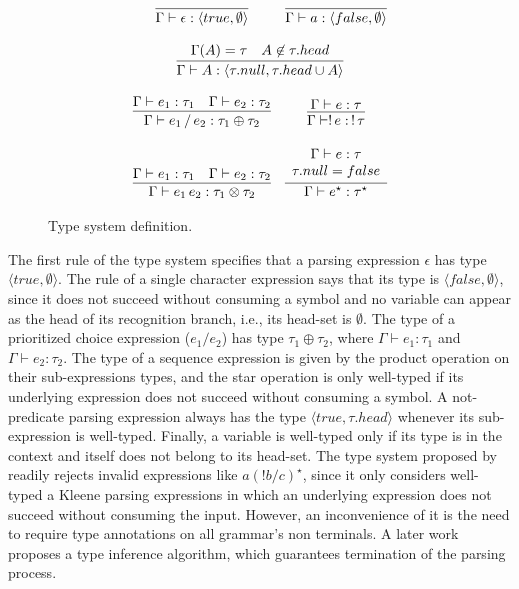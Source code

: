 \documentclass[preprint,12pt]{elsarticle}
\theoremstyle{definition}
\begin{document}
\begin{figure}[h!]
\[
  \begin{array}{cc}
    \infer{\Gamma \vdash \epsilon : \langle true , \emptyset \rangle}{} &
    \infer{\Gamma \vdash a : \langle false , \emptyset\rangle}{} \\ \\
    \multicolumn{2}{c}{
      \infer{\Gamma \vdash A : \langle \tau.null, \tau.head \cup {A}\rangle}
            {\Gamma(A) = \tau & A \not\in \tau.head}
    }\\ \\
    \infer{\Gamma\vdash e_1\,/\,e_2 : \tau_1 \oplus \tau_2}
          {\Gamma \vdash e_1 : \tau_1 & \Gamma \vdash e_2 : \tau_2}
    &
    \infer{\Gamma\vdash !\,e :\, !\,\tau}
          {\Gamma \vdash e : \tau}\\ \\
    \infer{\Gamma\vdash e_1\,e_2 : \tau_1 \otimes \tau_2}
          {\Gamma \vdash e_1 : \tau_1 & \Gamma \vdash e_2 : \tau_2} &
    \infer{\Gamma\vdash e^\star : \tau^\star}
          {\begin{array}{c}
             \Gamma \vdash e : \tau\\
             \tau.null = false\\
           \end{array}}
  \end{array}
\]
\centering
\caption{Type system definition.}
\label{fig:typesystem}
\end{figure}

The first rule of the type system specifies that a parsing
expression $\epsilon$ has type $\langle true, \emptyset \rangle$.
The rule of a single character expression says that its type is
$\langle false, \emptyset\rangle$, since it does not succeed without
consuming a symbol and no variable can appear as the head of its
recognition branch, i.e., its head-set is $\emptyset$. The type of a prioritized
choice expression ($e_1/e_2$) has type $\tau_1 \oplus \tau_2$,
where $\Gamma \vdash e_1 : \tau_1$ and $\Gamma \vdash e_2 : \tau_2$.
The type of a sequence expression is given by the product operation
on their sub-expressions types, and the star operation is only well-typed
if its underlying expression does not succeed without consuming
a symbol. A not-predicate parsing expression always has the type
$\langle true,\tau.head \rangle$ whenever its sub-expression is well-typed.
Finally, a variable is well-typed only if its type is in the context and
itself does not belong to its head-set.
The type system proposed by~\cite{Ribeiro19} readily rejects invalid expressions like
$a(!b / c)^\star$, since it only considers well-typed a Kleene parsing
expressions in which an underlying expression does
not succeed without consuming the input. However, an inconvenience of it is
the need to require type annotations on all grammar's non terminals.
A later work~\cite{Cardoso23} proposes a type inference algorithm, which
guarantees termination of the parsing process.
\end{document}
